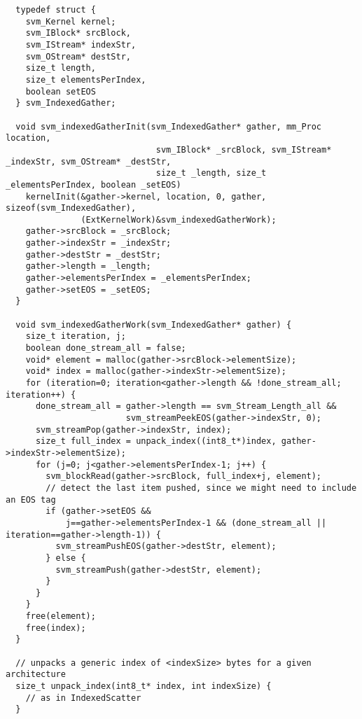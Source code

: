 \clearpage
\makeline
{}
{\small
\begin{verbatim}
  typedef struct {
    svm_Kernel kernel;
    svm_IBlock* srcBlock,
    svm_IStream* indexStr,
    svm_OStream* destStr,
    size_t length,
    size_t elementsPerIndex,
    boolean setEOS
  } svm_IndexedGather;

  void svm_indexedGatherInit(svm_IndexedGather* gather, mm_Proc location, 
                              svm_IBlock* _srcBlock, svm_IStream* _indexStr, svm_OStream* _destStr,
                              size_t _length, size_t _elementsPerIndex, boolean _setEOS)
    kernelInit(&gather->kernel, location, 0, gather, sizeof(svm_IndexedGather), 
               (ExtKernelWork)&svm_indexedGatherWork);
    gather->srcBlock = _srcBlock;
    gather->indexStr = _indexStr;
    gather->destStr = _destStr;
    gather->length = _length;
    gather->elementsPerIndex = _elementsPerIndex;
    gather->setEOS = _setEOS;
  }

  void svm_indexedGatherWork(svm_IndexedGather* gather) {
    size_t iteration, j;
    boolean done_stream_all = false;
    void* element = malloc(gather->srcBlock->elementSize);
    void* index = malloc(gather->indexStr->elementSize);
    for (iteration=0; iteration<gather->length && !done_stream_all; iteration++) {
      done_stream_all = gather->length == svm_Stream_Length_all && 
                        svm_streamPeekEOS(gather->indexStr, 0);
      svm_streamPop(gather->indexStr, index);
      size_t full_index = unpack_index((int8_t*)index, gather->indexStr->elementSize);
      for (j=0; j<gather->elementsPerIndex-1; j++) {
        svm_blockRead(gather->srcBlock, full_index+j, element);
        // detect the last item pushed, since we might need to include an EOS tag
        if (gather->setEOS && 
            j==gather->elementsPerIndex-1 && (done_stream_all || iteration==gather->length-1)) {
          svm_streamPushEOS(gather->destStr, element);
        } else {
          svm_streamPush(gather->destStr, element);
        }
      }
    }
    free(element);
    free(index);
  }

  // unpacks a generic index of <indexSize> bytes for a given architecture
  size_t unpack_index(int8_t* index, int indexSize) {
    // as in IndexedScatter
  }
\end{verbatim}}
